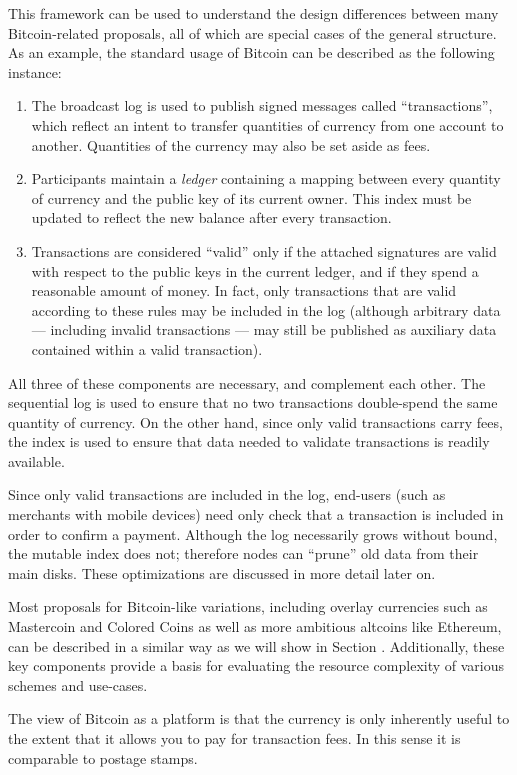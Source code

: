 This framework can be used to understand the design differences between many Bitcoin-related proposals, all of which are special cases of the general structure. As an example, the standard usage of Bitcoin can be described as the following instance:
\begin{enumerate}
\item The broadcast log is used to publish signed messages called ``transactions'', which reflect an intent to transfer quantities of currency from one account to another. Quantities of the currency may also be set aside as fees.
\item Participants maintain a \emph{ledger} containing a mapping between every quantity of currency and the public key of its current owner. This index must be updated to reflect the new balance after every transaction.
\item Transactions are considered ``valid'' only if the attached signatures are valid with respect to the public keys in the current ledger, and if they spend a reasonable amount of money. In fact, only transactions that are valid according to these rules may be included in the log (although arbitrary data --- including invalid transactions --- may still be published as auxiliary data contained within a valid transaction).
\end{enumerate}
All three of these components are necessary, and complement each other. The sequential log is used to ensure that no two transactions double-spend the same quantity of currency. On the other hand, since only valid transactions carry fees, the index is used to ensure that data needed to validate transactions is readily available.

Since only valid transactions are included in the log, end-users (such as merchants with mobile devices) need only check that a transaction is included in order to confirm a payment. Although the log necessarily grows without bound, the mutable index does not; therefore nodes can ``prune'' old data from their main disks. These optimizations are discussed in more detail later on.

Most proposals for Bitcoin-like variations, including overlay currencies such as Mastercoin and Colored Coins as well as more ambitious altcoins like Ethereum, can be described in a similar way as we will show in Section . Additionally, these key components provide a basis for evaluating the resource complexity of various schemes and use-cases.

The view of Bitcoin as a platform is that the currency is only inherently useful to the extent that it allows you to pay for transaction fees. In this sense it is comparable to postage stamps.


